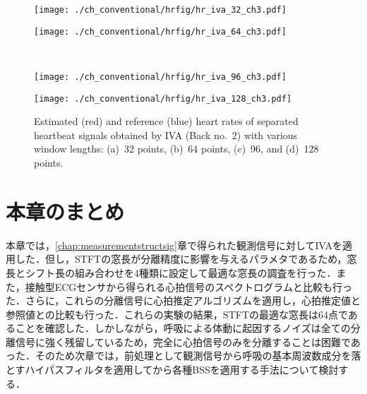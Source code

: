 \begin{figure}[htbp]
      \begin{minipage}[t]{0.45\hsize}
        \centering
        \texttt{[image: ./ch\_conventional/hrfig/hr\_iva\_32\_ch3.pdf]}
        \label{fig:hriva32ch3}
      \end{minipage} 
      \begin{minipage}[t]{0.45\hsize}
        \centering
        \texttt{[image: ./ch\_conventional/hrfig/hr\_iva\_64\_ch3.pdf]}
        \label{fig:hriva64ch3}
      \end{minipage} \\
   
      \begin{minipage}[t]{0.45\hsize}
        \centering
        \texttt{[image: ./ch\_conventional/hrfig/hr\_iva\_96\_ch3.pdf]}
        \label{fig:hriva96ch3}
      \end{minipage} 
      \begin{minipage}[t]{0.45\hsize}
        \centering
        \texttt{[image: ./ch\_conventional/hrfig/hr\_iva\_128\_ch3.pdf]}
        \label{fig:hriva128ch3}
      \end{minipage} 
     \caption{Estimated (red) and reference (blue) heart rates of separated heartbeat signals obtained by IVA (Back no.~2) with various window lengths: (a)~32 points, (b)~64 points, (c)~96, and (d)~128 points.}
     \label{fig:hrivawinlen}
  \end{figure}

\section{本章のまとめ}
\label{sec:conv:conclusion4}
本章では，\ref{chap:measurementstructsig}章で得られた観測信号に対してIVAを適用した．但し，STFTの窓長が分離精度に影響を与えるパラメタであるため，窓長とシフト長の組み合わせを4種類に設定して最適な窓長の調査を行った．また，接触型ECGセンサから得られる心拍信号のスペクトログラムと比較も行った．さらに，これらの分離信号に心拍推定アルゴリズムを適用し，心拍推定値と参照値との比較も行った．これらの実験の結果，STFTの最適な窓長は64点であることを確認した．しかしながら，呼吸による体動に起因するノイズは全ての分離信号に強く残留しているため，完全に心拍信号のみを分離することは困難であった．そのため次章では，前処理として観測信号から呼吸の基本周波数成分を落とすハイパスフィルタを適用してから各種BSSを適用する手法について検討する．



